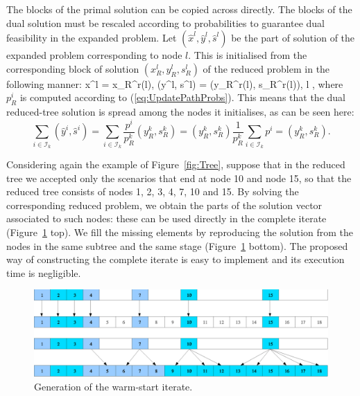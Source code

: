 The blocks of the primal solution can be copied across directly.
The blocks of the dual solution must be rescaled according to probabilities
to guarantee dual feasibility in the expanded problem.
Let $(\hat x^{l}, \hat y^{l}, \hat s^{l})$ be the part of solution
of the expanded problem corresponding to node $l$. This is initialised
from the corresponding block of solution $(x_R^{l}, y_R^{l},  s_R^{l})$
of the reduced problem in the following manner:
\be  \label{eq:WarmstartSolution}
  \hat x^{l} = x_R^{r(l)}, \qquad 
 (\hat y^{l}, \hat s^{l}) =  (y_R^{r(l)}, s_R^{r(l)}),
  \qquad l \in \Ctree,
\ee
where $p^i_R$ is computed according to (\ref{eq:UpdatePathProbs}).
This means that the dual reduced-tree solution is spread among the
nodes it initialises, as can be seen here:
\[
   \sum_{i \in \mathcal{I}_k} (\hat y^i, \hat s^i)
  = \sum_{i \in \mathcal{I}_k} \frac{p^i}{p^k_R} (y^k_R, s^k_R)
  = (y^k_R, s^k_R) \frac{1}{p^k_R} \sum_{i \in \mathcal{I}_k} p^i 
  = (y^k_R, s^k_R).
\]

Considering again the example of Figure~\ref{fig:Tree}, suppose that 
in the reduced tree we accepted only the scenarios that end at 
node 10 and node 15, so that the reduced tree consists of nodes 
1, 2, 3, 4, 7, 10 and 15. By solving the corresponding reduced problem, 
we obtain the parts of the solution vector associated to such 
nodes: these can be used directly in the complete iterate
(Figure~\ref{fig:Solution} top). 
We fill the missing elements 
by reproducing the solution from the nodes in the same subtree 
and the same stage (Figure~\ref{fig:Solution} bottom).
The proposed way of constructing the complete iterate is easy to
implement and its execution time is negligible.
%
\begin{figure}[ht]
  \begin{center}
    \includegraphics[scale=.51]{figures/solution.eps}
    \caption{Generation of the warm-start iterate.}
    \label{fig:Solution}
  \end{center}
  \vspace{-3ex}
\end{figure}

